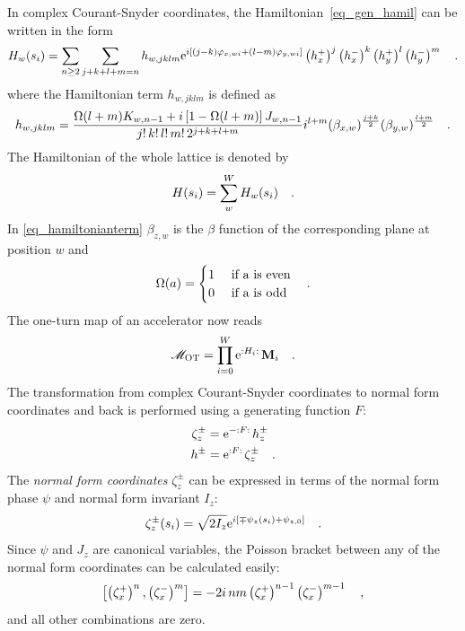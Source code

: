 In complex Courant-Snyder coordinates, the Hamiltonian~\eqref{eq_gen_hamil} can be written in the form
%
\begin{equation}
    H_w(s_i) = \sum\limits_{n\geq2} \sum\limits_{j+k+l+m=n} h_{w,jklm}
    \text{e}^{i \left[
        (j-k) \varphi_{x,wi} + (l-m) \varphi_{y,wi}
    \right]}
    \left(h_x^+\right)^j
    \left(h_x^-\right)^k
    \left(h_y^+\right)^l
    \left(h_y^-\right)^m
    \quad .
\end{equation}
%
where the Hamiltonian term $h_{w,jklm}$ is defined as
%
\begin{equation}
    h_{w,jklm} = 
    \frac{
        \Omega(l+m) K_{w,n-1} + i\left[1-\Omega(l+m)\right] J_{w,n-1}
    }{
        j!\,k!\,l!\,m!\,2^{j+k+l+m}
    }
    i^{l+m}
    (\beta_{x,w})^{\frac{j+k}{2}}
    (\beta_{y,w})^{\frac{l+m}{2}}
    \quad .
    \label{eq_hamiltonianterm}
\end{equation}
%
The Hamiltonian of the whole lattice is denoted by
%
\begin{equation}
    H(s_i) = \sum\limits_w^W H_w(s_i)
    \label{eq_Hamil_sa}
    \quad .
\end{equation}
%
In \eqref{eq_hamiltonianterm} $\beta_{z,w}$ is the $\beta$ function of the corresponding plane at position $w$
and
%
\begin{equation}
    \Omega(a) = 
    \begin{cases}
        1 &\text{ if a is even} \\
        0 &\text{ if a is odd} \\
    \end{cases}
    \quad .
\end{equation}
%
The one-turn map of an accelerator now reads
%
\begin{equation}
    \mathscr{M}_\text{OT} = \prod\limits_{i=0}^W \text{e}^{{:}H_i{:}\,} \mathbf{M}_i
    \quad .
\end{equation}
%
The transformation from complex Courant-Snyder coordinates to normal form coordinates and back is performed
using a generating function $F$:
%
\begin{align}
    \zeta_z^\pm &= \text{e}^{-{:}F{:}\,} h_z^\pm 
    \label{eq_z_from_h} \\
    h^\pm &= \text{e}^{{:}F{:}\,} \zeta_z^\pm
    \label{eq_h_from_z}
    \quad .
\end{align}
%
The \emph{normal form coordinates} $\zeta_z^\pm$
can be expressed in terms of the normal form phase $\psi$ and normal form invariant $I_z$:
%
\begin{equation}
    \zeta_z^\pm(s_i) = \sqrt{2I_z}\text{e}^{i\left[\mp \psi_z(s_i) + \psi_{z,0} \right]}
    \quad .
\end{equation}
%
Since $\psi$ and $J_z$ are canonical variables, the Poisson bracket between any of the normal form
coordinates can be calculated easily:
%
\begin{equation}
    \left[ \left(\zeta_x^+\right)^{n}, \left(\zeta_x^-\right)^{m}\right] = -2i\,nm\left(\zeta_x^+\right)^{n-1}\left(\zeta_x^-\right)^{m-1}
    \quad ,
    \label{eq_poiss_br_ident}
\end{equation}
and all other combinations are zero.
%

